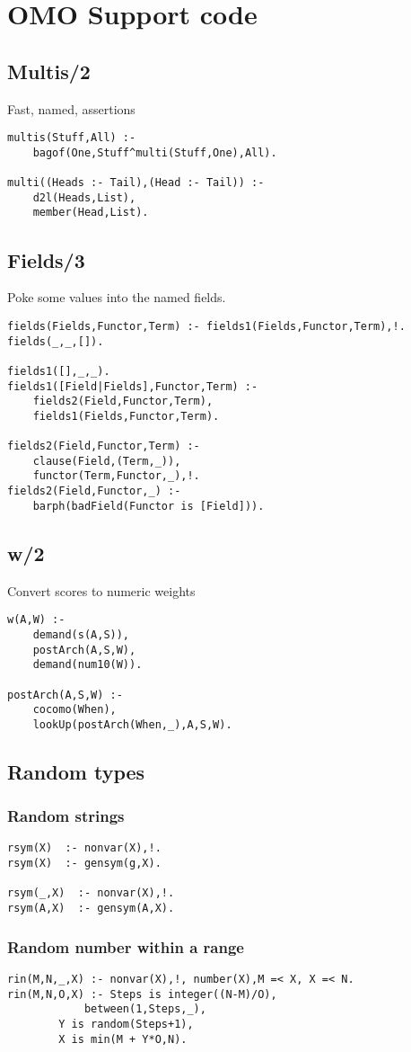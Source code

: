 \section{ OMO Support code
}
\subsection{ Multis/2
}
Fast, named, assertions
\begin{Verbatim}
multis(Stuff,All) :-
	bagof(One,Stuff^multi(Stuff,One),All).

multi((Heads :- Tail),(Head :- Tail)) :-
	d2l(Heads,List),
	member(Head,List).
\end{Verbatim}
\subsection{ Fields/3
}
Poke some values into the named fields.
\begin{Verbatim}
fields(Fields,Functor,Term) :- fields1(Fields,Functor,Term),!.
fields(_,_,[]).

fields1([],_,_).
fields1([Field|Fields],Functor,Term) :-
	fields2(Field,Functor,Term),
	fields1(Fields,Functor,Term).

fields2(Field,Functor,Term) :-
	clause(Field,(Term,_)),
	functor(Term,Functor,_),!.
fields2(Field,Functor,_) :-
	barph(badField(Functor is [Field])).
\end{Verbatim}
\subsection{ w/2
}
Convert scores to numeric weights
\begin{Verbatim}
w(A,W) :-
	demand(s(A,S)),
	postArch(A,S,W),
	demand(num10(W)).

postArch(A,S,W) :-
	cocomo(When),
	lookUp(postArch(When,_),A,S,W).
\end{Verbatim}
\subsection{ Random types
}
\subsubsection{ Random strings
}
\begin{Verbatim}
rsym(X)  :- nonvar(X),!.
rsym(X)  :- gensym(g,X).

rsym(_,X)  :- nonvar(X),!.
rsym(A,X)  :- gensym(A,X).
\end{Verbatim}
\subsubsection{ Random number within a range }\begin{Verbatim}
rin(M,N,_,X) :- nonvar(X),!, number(X),M =< X, X =< N.
rin(M,N,O,X) :- Steps is integer((N-M)/O),
	        between(1,Steps,_),
		Y is random(Steps+1),
		X is min(M + Y*O,N).
\end{Verbatim}
